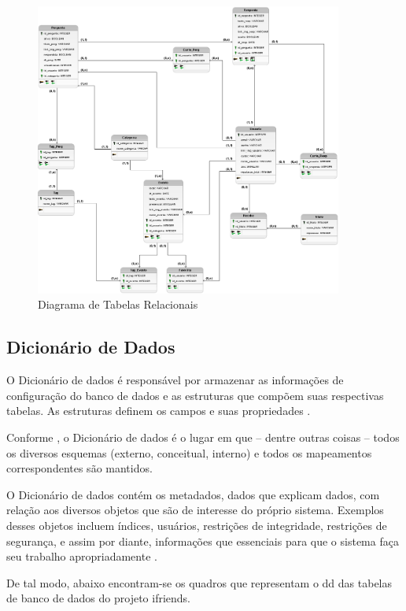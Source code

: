 \begin{figure}[htb]
\centering
\caption{Diagrama de Tabelas Relacionais}
\label{diagrama_TabelasRelacionais}
\includegraphics[width=0.9\textwidth]{anexos/Imagens_Diagramas/DTR_IFriends.png}
\end{figure}
\FloatBarrier

\subsection{Dicionário de Dados}

O Dicionário de dados é responsável por armazenar as informações de configuração do banco de dados e as estruturas que compõem suas respectivas tabelas. As estruturas definem os campos e suas propriedades \cite{alvesbanco}.

Conforme , o Dicionário de dados é o lugar em que – dentre outras coisas – todos os diversos esquemas (externo, conceitual, interno) e todos os mapeamentos correspondentes são mantidos.

O Dicionário de dados contém os metadados, dados que explicam dados, com relação aos diversos objetos que são de interesse do próprio sistema. Exemplos desses objetos incluem índices, usuários, restrições de integridade, restrições de segurança, e assim por diante, informações que essenciais para que o sistema faça seu trabalho apropriadamente \cite{date2004introdução}.

De tal modo, abaixo encontram-se os quadros que representam o \ac{dd} das tabelas de banco de dados do projeto \gls{ifriends}.

